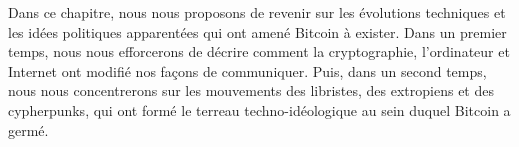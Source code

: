 Dans ce chapitre, nous nous proposons de revenir sur les évolutions techniques et les idées politiques apparentées qui ont amené Bitcoin à exister. Dans un premier temps, nous nous efforcerons de décrire comment la cryptographie, l'ordinateur et Internet ont modifié nos façons de communiquer. Puis, dans un second temps, nous nous concentrerons sur les mouvements des libristes, des extropiens et des cypherpunks, qui ont formé le terreau techno-idéologique au sein duquel Bitcoin a germé.

%
%
%
%

